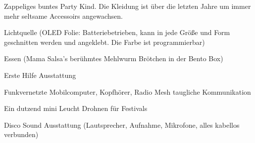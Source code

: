 \begin{npcBox}[title=Disco]
    \begin{stressSection}
    \end{stressSection}
    \begin{tabularx}{\textwidth}{ XX }
    \end{tabularx}

    \begin{consequences}
    \item {}
    \item {}
    \item {}
    \end{consequences}

    \begin{npcDescription}
    Zappeliges buntes Party Kind. Die Kleidung ist über die letzten Jahre um immer mehr seltsame Accessoirs angewachsen.
    \end{npcDescription}


    \begin{equipment}
    \item Lichtquelle (OLED Folie: Batteriebetrieben, kann in jede Größe und Form geschnitten werden und angeklebt. Die Farbe ist programmierbar)
    \item Essen (Mama Salsa's berühmtes Mehlwurm Brötchen in der Bento Box)
    \item Erste Hilfe Ausstattung
    \item Funkvernetzte Mobilcomputer, Kopfhörer, Radio Mesh taugliche Kommunikation
    \item Ein dutzend mini Leucht Drohnen für Festivals
    \item Disco Sound Ausstattung (Lautsprecher, Aufnahme, Mikrofone, alles kabellos verbunden)
    \end{equipment}
\end{npcBox}

